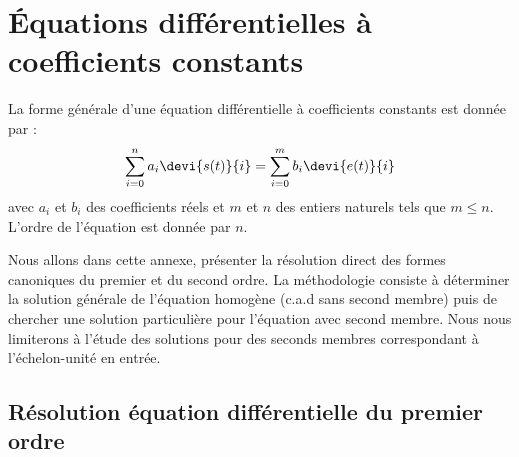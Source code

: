 \chapter{Équations différentielles à coefficients 
         constants\label{annexe-eqndiff}}
La forme générale d'une équation différentielle à coefficients constants est 
donnée par :
\begin{align}
\sum_{i=0}^{n}a_i\devi{s(t)}{i}=\sum_{i=0}^{m}b_i\devi{e(t)}{i}
\end{align}
avec $a_i$ et $b_i$ des coefficients réels et $m$ et $n$ des entiers naturels 
tels que $m\le n$. L'ordre de l'équation est donnée par $n$.

Nous allons dans cette annexe, présenter la résolution direct 
des formes canoniques du premier et du second ordre. La méthodologie consiste
à déterminer la solution générale de l'équation homogène (c.a.d sans second 
membre) puis de chercher une solution particulière pour l'équation avec second 
membre. Nous nous limiterons à l'étude des solutions pour des seconds membres 
correspondant à l'échelon-unité en entrée.

\section[Premier ordre]{Résolution équation différentielle du premier ordre}
